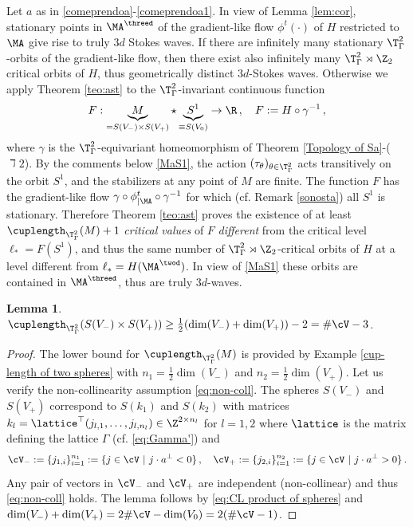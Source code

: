 \documentclass[11pt,a4paper,reqno]{article}
\numberwithin{equation}{section}
\newtheorem{lemma}[theorem]{Lemma}
\theoremstyle{definition}
\begin{document}
    Let 
    $a $ as in 
    \eqref{comeprendoa}-\eqref{comeprendoa1}. 
    In view of Lemma
    \ref{lem:cor}, stationary points in $  \MA^{\threed} $ of the gradient-like flow 
    $ \phi^t( \cdot ) $  of $ H $  restricted to  $ \MA $ give rise to truly $3d $ Stokes waves.  
    If there are infinitely many stationary 
    $ \T^2_\Gamma $-orbits of the gradient-like flow, then there exist also infinitely many
    $ \T^2_\Gamma \rtimes \Z_2 $
    critical orbits of $ H $, thus geometrically distinct $ 3d $-Stokes waves.
    Otherwise  
we apply Theorem \ref{teo:ast}
to the $ \T^2_\Gamma $-invariant continuous 
function 
$$ 
F : \underbrace{M}_{= S(V_-)\times S(V_+)} \star 
\underbrace{S^1}_{\equiv S(V_0)}  \to \R \, , \quad 
F := H \circ \gamma^{-1}  \, , 
$$ 
where $ \gamma $ is the  
$ \T^2_\Gamma $-equivariant homeomorphism of  Theorem 
\ref{Topology of Sa}-($\daleth 2$). 
By the comments below  \eqref{MaS1}, the action  $ (\tau_\theta)_{\theta \in \T^2_\Gamma}$  acts transitively 
on the orbit $S^1$,
and 
the  stabilizers  
at any point  
of  $ M $ are finite.  
The function $ F $ has the  gradient-like flow $  \gamma  \circ \phi^t_{| \MA} \circ \gamma^{-1}$ for which 
(cf. Remark \ref{sonosta}) 
all $ S^1 $ is stationary.
Therefore Theorem \ref{teo:ast} 
proves the existence  
of at least $ \cuplength_{\T^2_\Gamma}(M)+1 $
{\it critical values} of $ F$ 
{\it different} from the critical level  
$ \ell_* = F(S^1) $,
and thus 
the same number of 
$ \T^2_\Gamma  \rtimes \Z_2 $-critical orbits of $ H $ 
at a level different from 
$ \ell_* = H (\MA^{\twod})  $.
In view of \eqref{MaS1} these orbits are contained in $ \MA^{\threed} $, thus are truly $ 3d $-waves. 

\begin{lemma}
$ \cuplength_{\T^2_\Gamma}(S(V_-)\times S(V_+)) \geq \tfrac12(\dim(V_-)+\dim(V_+))-{2}=\#\cV- {3} $. 
\end{lemma}

\begin{proof}
The  lower bound for $ \cuplength_{\T^2_\Gamma}(M) $
is provided by Example \ref{cup-length of two spheres}
with $n_1=\tfrac12 \dim(V_-)$
and $n_2=\tfrac12 \dim(V_+)$.
 Let us verify the non-collinearity assumption \eqref{eq:non-coll}. 
The spheres $S(V_-)$ and $S(V_+)$ correspond to $S(k_1)$ and $S(k_2)$ with matrices $k_l =\lattice^{\top}(j_{l,1},\dots, j_{l, n_l})\in \Z^{2\times n_l }$ for $ l =1,2$ where $\lattice$ is the matrix defining the lattice $\Gamma$ (cf. \eqref{eq:Gamma'}) and  
    \begin{equation}\label{eq:cV+cV-}
    \cV_-:=\{j_{1, i}\}_{i=1}^{n_1}:=\{j\in \cV \ | \ j\cdot a^\bot<0\}\, , \quad \cV_+:=\{j_{2, i}\}_{i=1}^{n_2}:=\{j\in \cV \ | \ j\cdot a^\bot>0\}\, .
    \end{equation}
    Any pair of vectors in $ \cV_- $ and $ \cV_+ $ 
    are  independent 
    (non-collinear) 
    and thus  \eqref{eq:non-coll} holds. 
    The lemma follows by 
    \eqref{eq:CL product of spheres} and 
    $ \dim (V_-) + \dim (V_+)   = 2 \#\cV - \dim (V_0) =
    2 (\#\cV - 1)  $. 
\end{proof}
    
\end{document}
